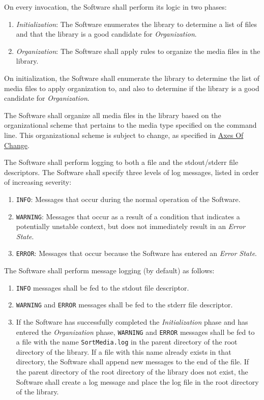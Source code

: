 \documentclass{designdoc}
\begin{document}
On every invocation, the Software shall perform its logic in two phases:
\begin{enumerate}
\item \textit{Initialization}: The Software enumerates the library to determine
  a list of files and that the library is a good candidate for
  \textit{Organization}.
\item \textit{Organization}: The Software shall apply rules to organize the
  media files in the library.
\end{enumerate}

On initialization, the Software shall enumerate the library to determine the
list of media files to apply organization to, and also to determine if the
library is a good candidate for \textit{Organization}.

The Software shall organize all media files in the library based on the
organizational scheme that pertains to the media type specified on the command
line. This organizational scheme is subject to change, as specified in
\hyperlink{sec:axesOfChange}{Axes Of Change}.

The Software shall perform logging to both a file and the stdout/stderr file
descriptors. The Software shall specify three levels of log messages, listed
in order of increasing severity:
\begin{enumerate}
\item \texttt{INFO}: Messages that occur during the normal operation of the
  Software.
\item \texttt{WARNING}: Messages that occur as a result of a condition that
  indicates a potentially unstable context, but does not immediately result
  in an \textit{Error State}.
\item \texttt{ERROR}: Messages that occur because the Software has entered an
  \textit{Error State}.
\end{enumerate}
The Software shall perform message logging (by default) as follows:
\begin{enumerate}
\item \texttt{INFO} messages shall be fed to the stdout file descriptor.
\item \texttt{WARNING} and \texttt{ERROR} messages shall be fed to the stderr
  file descriptor.
\item If the Software has successfully completed the \textit{Initialization}
  phase and has entered the \textit{Organization} phase, \texttt{WARNING} and
  \texttt{ERROR} messages shall be fed to a file with the name
  \texttt{SortMedia.log} in the parent directory of the root directory of the
  library. If a file with this name already exists in that directory, the
  Software shall append new messages to the end of the file. If the parent
  directory of the root directory of the library does not exist, the Software
  shall create a log message and place the log file in the root directory of
  the library.
\end{enumerate}
\end{document}
